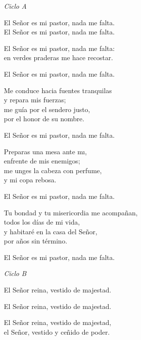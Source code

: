 \documentclass[12pt, letterpaper]{report}
\begin{document}
    \LARGE \textit{Ciclo A}

    \noindent
    \LARGE El Se\~nor es mi pastor, nada me falta.\\
    El Se\~nor es mi pastor, nada me falta.

    \noindent
    El Se\~nor es mi pastor, nada me falta:\\
    en verdes praderas me hace recostar.

    \noindent
    El Se\~nor es mi pastor, nada me falta.

    \noindent
    Me conduce hacia fuentes tranquilas\\
    y repara mis fuerzas;\\
    me gu\'ia por el sendero justo,\\
    por el honor de su nombre.

    \noindent
    El Se\~nor es mi pastor, nada me falta.

    \noindent
    Preparas una mesa ante m\i,\\
    enfrente de mis enemigos;\\
    me unges la cabeza con perfume,\\
    y mi copa rebosa.

    \noindent
    El Se\~nor es mi pastor, nada me falta.

    \noindent
    Tu bondad y tu misericordia me acompa\~nan,\\
    todos los d\'ias de mi vida,\\
    y habitar\'e en la casa del Se\~nor,\\
    por a\~nos sin t\'ermino.

    \noindent
    El Se\~nor es mi pastor, nada me falta.
    \clearpage



    \LARGE \textit{Ciclo B}

    \noindent
    \LARGE El Se\~nor reina, vestido de majestad.

    \noindent
    El Se\~nor reina, vestido de majestad.

    \noindent
    El Se\~nor reina, vestido de majestad,\\
    el Se\~nor, vestido y ce\~nido de poder.
\end{document}
